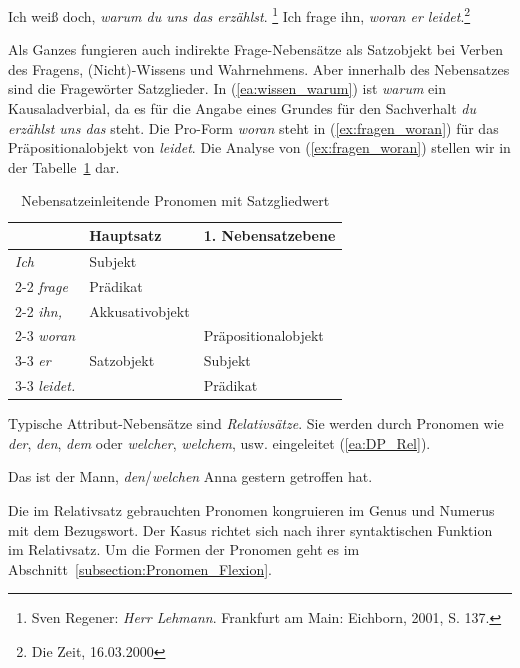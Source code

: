 \ea \label{ea:Frage-NeSa}
\ea \label{ea:wissen_warum} Ich weiß doch, \textit{warum du uns das erzählst}. \footnote{Sven Regener: \textit{Herr Lehmann}. Frankfurt am Main: Eichborn, 2001, S. 137.}
\ex \label{ex:fragen_woran} Ich frage ihn, \textit{woran er leidet}.\footnote{Die Zeit, 16.03.2000}
\z 
\z 

Als Ganzes fungieren auch indirekte Frage-Nebensätze als Satzobjekt bei Verben des Fragens, (Nicht)-Wissens und Wahrnehmens. Aber innerhalb des Nebensatzes sind die Fragewörter Satzglieder. In (\ref{ea:wissen_warum}) ist \textit{warum} ein Kausaladverbial, da es für die Angabe eines Grundes für den Sachverhalt \textit{du erzählst uns das} steht. Die Pro-Form \textit{woran} steht in (\ref{ex:fragen_woran}) für das Präpositionalobjekt von \textit{leidet}. Die Analyse von (\ref{ex:fragen_woran}) stellen wir in der Tabelle~\ref{tab:FrageNeSa} dar.

\begin{table}
  \centering
  \begin{tabular}{l|l|l}
      & Hauptsatz & 1. Nebensatzebene \\
    \hline
    \textit{Ich} & Subjekt &  \\ \cline{2-2}
    \textit{frage} & Prädikat & \\ \cline{2-2}
    \textit{ihn,} & Akkusativobjekt & \\ \cline{2-3}
    \textit{woran} & \multirow{3}{*}{Satzobjekt} & Präpositionalobjekt \\ \cline{3-3}  
    \textit{er} & & Subjekt  \\ \cline{3-3} 
    \textit{leidet.} & & Prädikat \\ 
    \hline 
  \end{tabular}
  \caption{Nebensatzeinleitende Pronomen mit Satzgliedwert}
  \label{tab:FrageNeSa}
\end{table}

Typische Attribut-Nebensätze sind \textit{Relativsätze}. Sie werden durch Pronomen wie \textit{der}, \textit{den}, \textit{dem} oder \textit{welcher}, \textit{welchem}, usw. eingeleitet (\ref{ea:DP_Rel}). 

\ea \label{ea:DP_Rel} Das ist der Mann, \textit{den}/\textit{welchen} Anna gestern getroffen hat.
\z 

Die im Relativsatz gebrauchten Pronomen kongruieren im Genus und Numerus mit dem Bezugswort. Der Kasus richtet sich nach ihrer syntaktischen Funktion im Relativsatz. Um die Formen der Pronomen geht es im Abschnitt~\ref{subsection:Pronomen_Flexion}.

